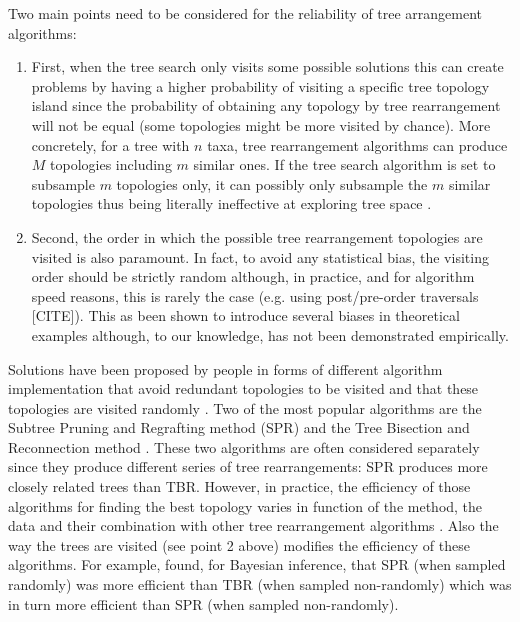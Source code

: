 \documentclass[12pt,letterpaper]{article}
\begin{document}
Two main points need to be considered for the reliability of tree arrangement algorithms:
\begin{enumerate}
    \item First, when the tree search only visits some possible solutions this can create problems by having a higher probability of visiting a specific tree topology island since the probability of obtaining any topology by tree rearrangement will not be equal (some topologies might be more visited by chance).
    More concretely, for a tree with $n$ taxa, tree rearrangement algorithms can produce $M$ topologies including $m$ similar ones.
    If the tree search algorithm is set to subsample $m$ topologies only, it can possibly only subsample the $m$ similar topologies thus being literally ineffective at exploring tree space \citep{allen2001subtree}.
    \item Second, the order in which the possible tree rearrangement topologies are visited is also paramount.
    In fact, to avoid any statistical bias, the visiting order should be strictly random \citep{goloboff2014bias} although, in practice, and for algorithm speed reasons, this is rarely the case (e.g. using post/pre-order traversals [CITE]).
    This as been shown to introduce several biases in theoretical examples \citep{goloboff2014bias} although, to our knowledge, has not been demonstrated empirically.
\end{enumerate}

Solutions have been proposed by people in forms of different algorithm implementation that avoid redundant topologies to be visited \citep{allen2001subtree} and that these topologies are visited randomly \citep{goloboff2014bias}.
Two of the most popular algorithms are the Subtree Pruning and Regrafting method (SPR) and the Tree Bisection and Reconnection method \citep[TBR - see Fig. \ref{Figure_SPR} and \ref{Figure_TBR} and text below for detailled description;][]{allen2001subtree,felsenstein2004inferring}.
These two algorithms are often considered separately since they produce different series of tree rearrangements: SPR produces more closely related trees than TBR.
However, in practice, the efficiency of those algorithms for finding the best topology varies in function of the method, the data and their combination with other tree rearrangement algorithms \citep[e.g.][]{morrison2007increasing,lakner2008efficiency}.
Also the way the trees are visited (see point 2 above) modifies the efficiency of these algorithms.
For example, \cite{lakner2008efficiency} found, for Bayesian inference, that SPR (when sampled randomly) was more efficient than TBR (when sampled non-randomly) which was in turn more efficient than SPR (when sampled non-randomly).
\end{document}
